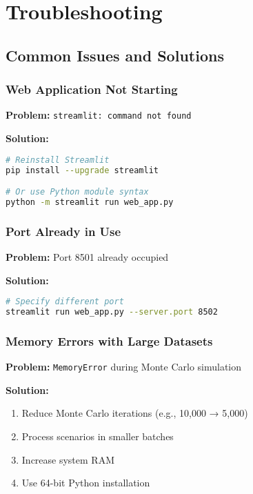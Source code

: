 \documentclass[11pt,a4paper]{article}
\begin{document}
\newpage

\section{Troubleshooting}

\subsection{Common Issues and Solutions}

\subsubsection{Web Application Not Starting}

\textbf{Problem:} \texttt{streamlit: command not found}

\textbf{Solution:}
\begin{lstlisting}[style=bashstyle, language=bash]
# Reinstall Streamlit
pip install --upgrade streamlit

# Or use Python module syntax
python -m streamlit run web_app.py
\end{lstlisting}

\subsubsection{Port Already in Use}

\textbf{Problem:} Port 8501 already occupied

\textbf{Solution:}
\begin{lstlisting}[style=bashstyle, language=bash]
# Specify different port
streamlit run web_app.py --server.port 8502
\end{lstlisting}

\subsubsection{Memory Errors with Large Datasets}

\textbf{Problem:} \texttt{MemoryError} during Monte Carlo simulation

\textbf{Solution:}
\begin{enumerate}[leftmargin=*]
    \item Reduce Monte Carlo iterations (e.g., 10,000 → 5,000)
    \item Process scenarios in smaller batches
    \item Increase system RAM
    \item Use 64-bit Python installation
\end{enumerate}
\end{document}
